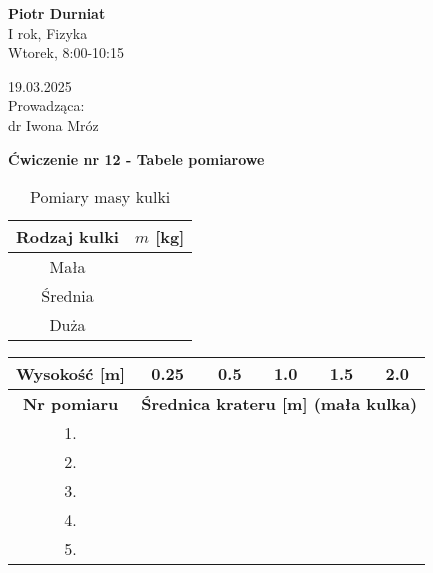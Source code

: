 \documentclass[a4paper,12pt]{article}
\begin{document}
\noindent
\begin{minipage}{0.5\textwidth}
    \raggedright
    \textbf{Piotr Durniat} \\
    I rok, Fizyka \\
    Wtorek, 8:00-10:15 \\
    \vspace{0.5cm}
    \vspace{0.5cm}
\end{minipage}%
\begin{minipage}{0.5\textwidth}
    \raggedleft
    19.03.2025  \\
    \vspace{0.5cm} %
    Prowadząca: \\
    dr Iwona Mróz
\end{minipage}

\begin{center}
    \LARGE \textbf{Ćwiczenie nr 12 - Tabele pomiarowe} \\[0.5cm]
\end{center}

\noindent

\begin{table}[h]
    \renewcommand{\arraystretch}{1.3}
    \setlength{\tabcolsep}{20pt}
    \begin{longtable}{|c|c|}
        \hline
        Rodzaj kulki & $m$ [kg] \\
        \hline
        Mała & \\
        Średnia & \\
        Duża & \\
        \hline
    \end{longtable}
    \caption{Pomiary masy kulki}
\end{table}

\begin{table}[H]
    \renewcommand{\arraystretch}{1.3}
    \setlength{\tabcolsep}{25pt}
    \begin{longtable}{|c|c|c|c|c|c|}
        \hline
        \textbf{Wysokość [m]} & 0.25 & 0.5 & 1.0 & 1.5 & 2.0 \\
        \hline
        \hline
        \textbf{Nr pomiaru } & \multicolumn{5}{c|}{\textbf{Średnica krateru [m] (mała kulka)}} \\
        \hline
        1. & & & & & \\
        \hline
        2. & & & & & \\
        \hline
        3. & & & & & \\
        \hline
        4. & & & & & \\
        \hline
        5. & & & & & \\
        \hline
    \end{longtable}
\end{table}
\end{document}
